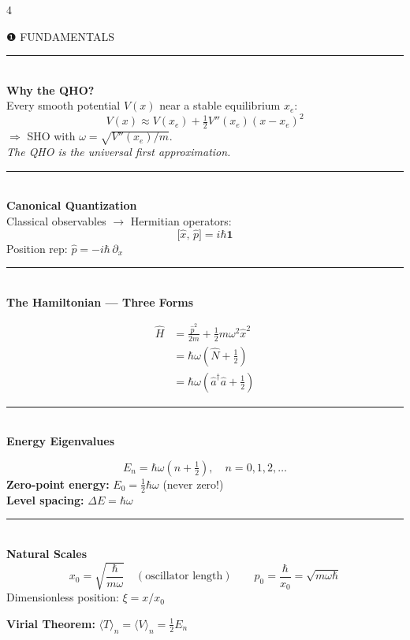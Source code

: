 \documentclass[9pt,landscape]{article}
\newcommand{\A}{\hat{a}}
\newcommand{\Ad}{\hat{a}^{\dagger}}
\newcommand{\N}{\hat{N}}
\newcommand{\x}{\hat{x}}
\newcommand{\p}{\hat{p}}
\newcommand{\H}{\hat{H}}
\newcommand{\xz}{x_0}                     %
\newcommand{\half}{\tfrac{1}{2}}
\newcommand{\mysec}[1]{%
  \vspace{3pt}%
  {\color{midviolet}\rule{\linewidth}{0.6pt}}\\[-1pt]%
  {\bfseries\color{deepviolet}\small #1}\\[0.5pt]%
}
\begin{document}
\begin{multicols}{4}


\begin{tcolorbox}[sectionbox]
  \centering ❶\; FUNDAMENTALS
\end{tcolorbox}

\mysec{Why the QHO?}
Every smooth potential $V(x)$ near a stable equilibrium $x_e$:
\[
  V(x) \approx V(x_e) + \tfrac{1}{2}V''(x_e)(x-x_e)^2
\]
$\Rightarrow$ SHO with $\omega = \sqrt{V''(x_e)/m}$.\\
\emph{The QHO is the universal first approximation.}

\mysec{Canonical Quantization}
Classical observables $\to$ Hermitian operators:
\[
  \bigl[\x,\,\p\bigr] = i\hbar \mathbf{1}
\]
Position rep: $\p = -i\hbar\,\partial_x$

\mysec{The Hamiltonian — Three Forms}
\begin{tcolorbox}[keybox]
\[
\begin{aligned}
  \H &= \frac{\p^2}{2m} + \frac{1}{2}m\omega^2\x^2 \\[3pt]
     &= \hbar\omega\!\left(\N + \half\right) \\[3pt]
     &= \hbar\omega\!\left(\Ad\A + \half\right)
\end{aligned}
\]
\end{tcolorbox}

\mysec{Energy Eigenvalues}
\begin{tcolorbox}[keybox]
\[
  \boxed{E_n = \hbar\omega\!\left(n+\half\right),\quad n=0,1,2,\ldots}
\]
\textbf{Zero-point energy:} $E_0 = \tfrac{1}{2}\hbar\omega$ (never zero!)\\
\textbf{Level spacing:} $\Delta E = \hbar\omega$
\end{tcolorbox}

\mysec{Natural Scales}
\[
  \xz = \sqrt{\frac{\hbar}{m\omega}}\quad(\text{oscillator length})
  \qquad p_0 = \frac{\hbar}{\xz} = \sqrt{m\omega\hbar}
\]
Dimensionless position: $\xi = x/\xz$

\begin{tcolorbox}[goldbox]
\textbf{Virial Theorem:}
$\langle T\rangle_n = \langle V\rangle_n = \tfrac{1}{2}E_n$
\end{tcolorbox}


\end{multicols}
\end{document}
